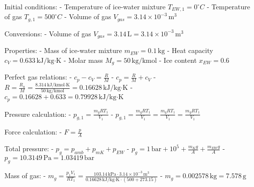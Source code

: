Initial conditions:  
- Temperature of ice-water mixture \( T_{EW,1} = 0^\circ C \)  
- Temperature of gas \( T_{g,1} = 500^\circ C \)  
- Volume of gas \( V_{gas} = 3.14 \times 10^{-3} \, \text{m}^3 \)  

Conversions:  
- Volume of gas \( V_{gas} = 3.14 \, \text{L} = 3.14 \times 10^{-3} \, \text{m}^3 \)  

Properties:  
- Mass of ice-water mixture \( m_{EW} = 0.1 \, \text{kg} \)  
- Heat capacity \( c_V = 0.633 \, \text{kJ/kg·K} \)  
- Molar mass \( M_g = 50 \, \text{kg/kmol} \)  
- Ice content \( x_{EW} = 0.6 \)  

Perfect gas relations:  
- \( c_p - c_V = \frac{R}{M} \)  
- \( c_p = \frac{R}{M} + c_V \)  
- \( R = \frac{R_u}{M} = \frac{8.314 \, \text{kJ/kmol·K}}{50 \, \text{kg/kmol}} = 0.16628 \, \text{kJ/kg·K} \)  
- \( c_p = 0.16628 + 0.633 = 0.79928 \, \text{kJ/kg·K} \)  

Pressure calculation:  
- \( p_{g,1} = \frac{m_g R T_1}{V_1} \)  
- \( p_{g,1} = \frac{m_g R T_1}{V_1} = \frac{m_g R T_1}{V_1} = \frac{m_g R T_1}{V_1} \)  

Force calculation:  
- \( F = \frac{p}{A} \)  

Total pressure:  
- \( p_{g} = p_{amb} + p_{mK} + p_{EW} \)  
- \( p_{g} = 1 \, \text{bar} + 10^5 + \frac{m_K g}{A} + \frac{m_{EW} g}{A} \)  
- \( p_{g} = 10.3149 \, \text{Pa} = 1.03419 \, \text{bar} \)  

Mass of gas:  
- \( m_g = \frac{p_1 V_1}{R T_1} = \frac{103.14 \, \text{kPa} \cdot 3.14 \times 10^{-3} \, \text{m}^3}{0.16628 \, \text{kJ/kg·K} \cdot (500 + 273.15)} \)  
- \( m_g = 0.002578 \, \text{kg} = 7.578 \, \text{g} \)